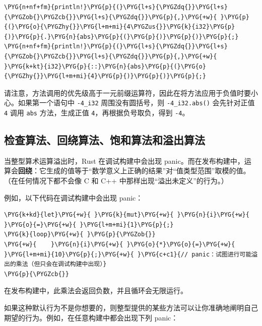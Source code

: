 \begin{Verbatim}[commandchars=\\\{\},breaklines=true,breakanywhere=true,fontsize=\codefont,xleftmargin=17bp]
\PYG{n+nf+fm}{println!}\PYG{p}{(}\PYG{l+s}{\PYGZdq{}}\PYG{l+s}{\PYGZob{}\PYGZcb{}}\PYG{l+s}{\PYGZdq{}}\PYG{p}{,}\PYG{+w}{ }\PYG{p}{(}\PYG{o}{\PYGZhy{}}\PYG{l+m+mi}{4\PYGZus{}}\PYG{k}{i32}\PYG{p}{)}\PYG{p}{.}\PYG{n}{abs}\PYG{p}{(}\PYG{p}{)}\PYG{p}{)}\PYG{p}{;}
\PYG{n+nf+fm}{println!}\PYG{p}{(}\PYG{l+s}{\PYGZdq{}}\PYG{l+s}{\PYGZob{}\PYGZcb{}}\PYG{l+s}{\PYGZdq{}}\PYG{p}{,}\PYG{+w}{ }\PYG{k+kt}{i32}\PYG{p}{::}\PYG{n}{abs}\PYG{p}{(}\PYG{o}{\PYGZhy{}}\PYG{l+m+mi}{4}\PYG{p}{)}\PYG{p}{)}\PYG{p}{;}
\end{Verbatim}

请注意，方法调用的优先级高于一元前缀运算符，因此在将方法应用于负值时要小心。如果第一个语句中 \texttt{-4\_i32} 周围没有圆括号，则 \texttt{-4\_i32.abs()} 会先针对正值 \texttt{4} 调用 \texttt{abs} 方法，生成正值 \texttt{4}，再根据负号取负，得到 \texttt{-4}。

\subsection{检查算法、回绕算法、饱和算法和溢出算法}

当整型算术运算溢出时，Rust 在调试构建中会出现 panic。而在发布构建中，运算会\textbf{回绕}：它生成的值等于“数学意义上正确的结果”对“值类型范围”取模的值。（在任何情况下都不会像 C 和 C++ 中那样出现“溢出未定义”的行为。）

例如，以下代码在调试构建中会出现 panic：

\begin{Verbatim}[commandchars=\\\{\},breaklines=true,breakanywhere=true,fontsize=\codefont,xleftmargin=17bp]
\PYG{k+kd}{let}\PYG{+w}{ }\PYG{k}{mut}\PYG{+w}{ }\PYG{n}{i}\PYG{+w}{ }\PYG{o}{=}\PYG{+w}{ }\PYG{l+m+mi}{1}\PYG{p}{;}
\PYG{k}{loop}\PYG{+w}{ }\PYG{p}{\PYGZob{}}
\PYG{+w}{    }\PYG{n}{i}\PYG{+w}{ }\PYG{o}{*}\PYG{o}{=}\PYG{+w}{ }\PYG{l+m+mi}{10}\PYG{p}{;}\PYG{+w}{ }\PYG{c+c1}{// panic：试图进行可能溢出的乘法（但只会在调试构建中出现）}
\PYG{p}{\PYGZcb{}}
\end{Verbatim}

在发布构建中，此乘法会返回负数，并且循环会无限运行。

如果这种默认行为不是你想要的，则整型提供的某些方法可以让你准确地阐明自己期望的行为。例如，在任意构建中都会出现下列 panic：

